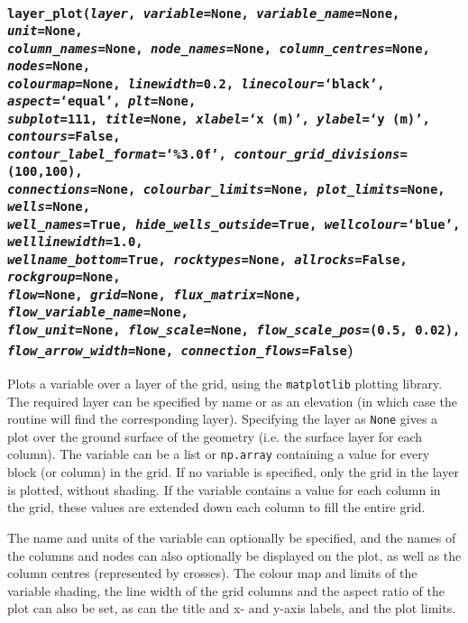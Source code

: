 \subsubsection{\texttt{layer\_plot(\emph{layer}, \emph{variable}=None, \emph{variable\_name}=None, \emph{unit}=None,\\
    \emph{column\_names}=None, \emph{node\_names}=None, \emph{column\_centres}=None, \emph{nodes}=None,\\
    \emph{colourmap}=None, \emph{linewidth}=0.2, \emph{linecolour}=`black', \emph{aspect}=`equal', \emph{plt}=None,\\
    \emph{subplot}=111, \emph{title}=None, \emph{xlabel}=`x (m)', \emph{ylabel}=`y (m)', \emph{contours}=False,\\
    \emph{contour\_label\_format}=`\%3.0f', \emph{contour\_grid\_divisions}=(100,100),\\
    \emph{connections}=None, \emph{colourbar\_limits}=None, \emph{plot\_limits}=None, \emph{wells}=None,\\
    \emph{well\_names}=True, \emph{hide\_wells\_outside}=True, \emph{wellcolour}=`blue', \emph{welllinewidth}=1.0,\\
    \emph{wellname\_bottom}=True, \emph{rocktypes}=None, \emph{allrocks}=False, \emph{rockgroup}=None,\\
    \emph{flow}=None, \emph{grid}=None, \emph{flux\_matrix}=None, \emph{flow\_variable\_name}=None, \\
    \emph{flow\_unit}=None, \emph{flow\_scale}=None, \emph{flow\_scale\_pos}=(0.5, 0.02),\\
    \emph{flow\_arrow\_width}=None, \emph{connection\_flows}=False})}
\label{sec:layer_plot}

Plots a variable over a layer of the grid, using the \texttt{matplotlib} plotting library.  The required layer can be specified by name or as an elevation (in which case the routine will find the corresponding layer).  Specifying the layer as \texttt{None} gives a plot over the ground surface of the geometry (i.e. the surface layer for each column).  The variable can be a list or \texttt{np.array} containing a value for every block (or column) in the grid.  If no variable is specified, only the grid in the layer is plotted, without shading.  If the variable contains a value for each column in the grid, these values are extended down each column to fill the entire grid.

The name and units of the variable can optionally be specified, and the names of the columns and nodes can also optionally be displayed on the plot, as well as the column centres (represented by crosses).  The colour map and limits of the variable shading, the line width of the grid columns and the aspect ratio of the plot can also be set, as can the title and x- and y-axis labels, and the plot limits.

